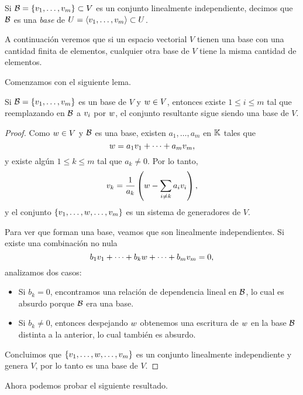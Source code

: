 \begin{defi}
Si $\B = \{\vb_1, \dots, \vb_m\} \subset V$ es un conjunto linealmente independiente, decimos que $\mathcal B$ es una \emph{base} de $U = \langle \vb_1, \dots, \vb_m \rangle \subset U$.
\end{defi}

A continuación veremos que si un espacio vectorial $V$ tienen una base con una cantidad finita de elementos, cualquier otra base de $V$ tiene la misma cantidad de elementos.

Comenzamos con el siguiente lema.

\begin{prop}
Si $\B = \{\vb_1, \dots, \vb_m\}$ es un base de $V$ y $\wb \in V$, entonces existe $1 \le i \le m$ tal que reemplazando en $\mathcal B$ a $\vb_i$ por $\wb$, el conjunto resultante sigue siendo una base de $V$.
\end{prop}

\begin{proof}
Como $\wb \in V$ y $\mathcal B$ es una base, existen $a_1, \dots, a_m$ en $\mathbb K$ tales que
$$ \wb= a_1 \vb_1 + \dots + a_m \vb_m,$$
y existe algún $1 \le k \le m$ tal que $a_k \neq 0$. Por lo tanto,
$$
\vb_k = \frac{1}{a_k}\left( \wb - \sum_{i \neq k} a_i \vb_i\right),
$$
y el conjunto $\{\vb_1, \dots, \wb, \dots, \vb_m\}$ es un sistema de generadores de $V$.

Para ver que forman una base, veamos que son linealmente independientes. Si existe una combinación no nula
$$
b_1 \vb_1 + \dots + b_k \wb + \dots + b_m \vb_m = 0,$$
analizamos dos casos:
\begin{itemize}
\item Si $b_k = 0$, encontramos una relación de dependencia lineal en $\mathcal B$, lo cual es absurdo porque $\mathcal B$ era una base.
\item Si $b_k \neq 0$, entonces despejando $\wb$ obtenemos una escritura de $\wb$ en la base $\mathcal B$ distinta a la anterior, lo cual tambi\'en es absurdo.
\end{itemize}

Concluimos que $\{\vb_1, \dots, \wb, \dots, \vb_m\}$ es un conjunto linealmente independiente y genera $V$, por lo tanto es una base de $V$.
\end{proof}

Ahora podemos probar el siguiente resultado.


